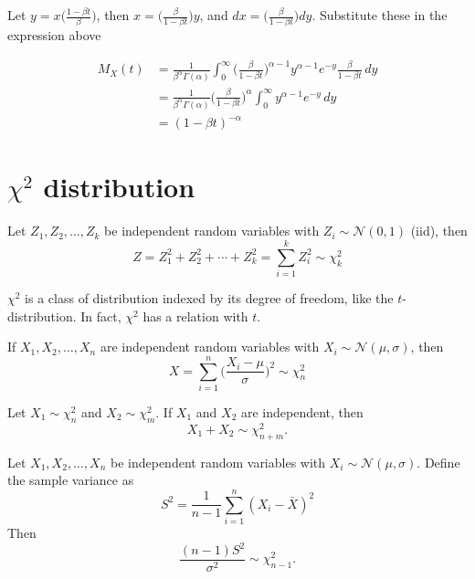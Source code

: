\documentclass{book}
\begin{document}
Let $y=x\big(\frac{1-\beta t}{\beta}\big)$, then $x=\big(\frac{\beta}{1-\beta t}\big) y$, and $dx=\big(\frac{\beta}{1-\beta t}\big) dy$. Substitute these in the expression above

\begin{align}
    M_{X}(t)&=\frac{1}{\beta^{\alpha}\Gamma(\alpha)} \int_{0}^{\infty}\Big(\frac{\beta}{1-\beta t}\Big)^{\alpha-1} y^{\alpha-1}e^{-y}\frac{\beta}{1-\beta t} \,dy\\
    &= \frac{1}{\beta^{\alpha}\Gamma(\alpha)}\Big(\frac{\beta}{1-\beta t}\Big)^{\alpha}\int_{0}^{\infty} y^{\alpha-1}e^{-y}\,dy\\
    &=(1-\beta t)^{-\alpha}
\end{align}


\section{$\chi^{2}$ distribution}

Let $Z_{1},Z_{2},\ldots,Z_{k}$ be independent random variables with $Z_{i}\sim \mathcal{N}(0,1)$ (iid), then
\begin{equation}
Z=Z_{1}^{2}+Z_{2}^{2}+\cdots+Z_{k}^{2}=\sum_{i=1}^{k} Z_{i}^{2} \sim \chi^{2}_{k}
\end{equation}

 $\chi^{2}$ is a class of distribution indexed by its degree of freedom, like the $t$-distribution. In fact, $\chi^{2}$ has a relation with $t$.

If $X_1 ,X_2,\ldots,X_n$ are independent random variables with $X_{i}\sim \mathcal{N}(\mu,\sigma)$, then
\begin{equation}
X =\sum_{i=1}^{n}\bigg(\frac{X_{i}-\mu}{\sigma}\bigg)^{2}\sim \chi^{2}_{n}
\end{equation}

Let $X_{1} \sim \chi^{2}_{n}$ and $X_{2} \sim \chi^{2}_{m}$. If $X_{1}$ and $X_{2}$ are independent, then
\begin{equation}
X_{1}+X_{2} \sim \chi^{2}_{n+m}.
\end{equation}



Let $X_{1},X_{2},\ldots,X_{n}$ be independent random variables with $X_{i}\sim \mathcal{N}(\mu,\sigma)$.  Define the sample variance as
\begin{equation}
    S^{2} = \frac{1}{n-1} \sum_{i=1}^{n}(X_{i}-\bar{X})^{2}
\end{equation}
Then
\begin{equation}
    \frac{(n-1)S^{2}}{\sigma^{2}}\sim \chi^{2}_{n-1}.
\end{equation}
\end{document}
